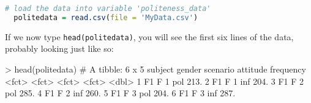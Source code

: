 \documentclass[fleqn,reqno,12pt]{article}
\newcommand{\ri}[1]{\lstinline{#1}}  %
\begin{document}
\begin{lstlisting}[language=R]
  # load the data into variable 'politeness_data'
  politedata = read.csv(file = 'MyData.csv')     
\end{lstlisting}

If we now type \ri{head(politedata)}, you will see the first six lines of the data, probably looking just like so:

\medskip


\begin{rc}
> head(politedata)
# A tibble: 6 x 5
  subject gender scenario attitude frequency
  <fct>   <fct>  <fct>    <fct>        <dbl>
1 F1      F      1        pol           213.
2 F1      F      1        inf           204.
3 F1      F      2        pol           285.
4 F1      F      2        inf           260.
5 F1      F      3        pol           204.
6 F1      F      3        inf           287.
\end{rc}


\printbibliography[heading=bibintoc]
\end{document}
